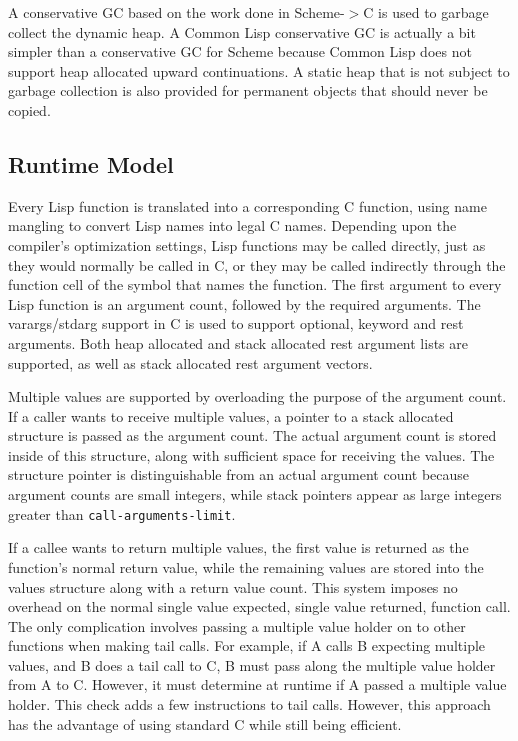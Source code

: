 A conservative GC based on the work done in Scheme-$>$C \cite{gc1} is used to
garbage collect the dynamic heap. A Common Lisp conservative GC is
actually a bit simpler than a conservative GC for Scheme because
Common Lisp does not support heap allocated upward continuations.  A static
heap that is not subject to garbage collection is also provided for
permanent objects that should never be copied.

\subsection{Runtime Model}

Every Lisp function is translated into a corresponding C function,
using name mangling to convert Lisp names into legal C names.
Depending upon the compiler's optimization settings, Lisp functions
may be called directly, just as they would normally be called in C, or
they may be called indirectly through the function cell of the symbol
that names the function. The first argument to every Lisp function is
an argument count, followed by the required arguments.  The
varargs/stdarg support in C is used to support optional, keyword
and rest arguments. Both heap allocated and stack
allocated rest argument lists are supported, as well as stack
allocated rest argument vectors.

Multiple values are supported by overloading the purpose of the
argument count. If a caller wants to receive multiple values, a pointer
to a stack allocated structure is passed as the argument count. The
actual argument count is stored inside of this structure, along with
sufficient space for receiving the values. The structure pointer is
distinguishable from an actual argument count because argument counts
are small integers, while stack pointers appear as large integers
greater than {\tt call-arguments-limit}.

If a callee wants to return multiple values, the first value is
returned as the function's normal return value, while the remaining
values are stored into the values structure along with a return value
count.  This system imposes no overhead on the normal single value
expected, single value returned, function call. The only complication
involves passing a multiple value holder on to other functions when
making tail calls.  For example, if A calls B expecting multiple
values, and B does a tail call to C, B must pass along the multiple
value holder from A to C.  However, it must determine at runtime if A
passed a multiple value holder. This check adds a few instructions to
tail calls. However, this approach has the advantage of using standard
C while still being efficient.

